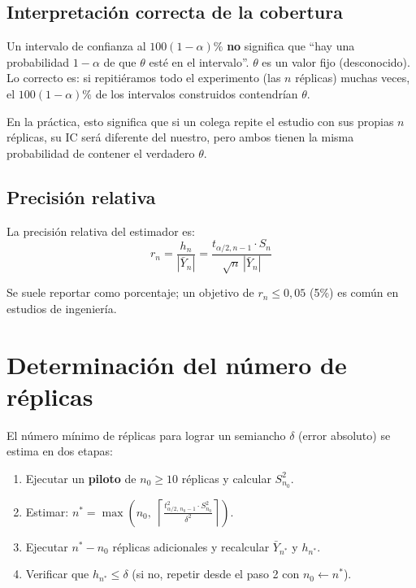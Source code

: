 \documentclass[11pt, letterpaper]{article}
\begin{document}
\subsection{Interpretación correcta de la cobertura}

\begin{definicionbox}
Un intervalo de confianza al $100(1-\alpha)\%$ \textbf{no} significa que ``hay una probabilidad $1-\alpha$ de que $\theta$ esté en el intervalo''. $\theta$ es un valor fijo (desconocido). Lo correcto es: si repitiéramos todo el experimento (las $n$ réplicas) muchas veces, el $100(1-\alpha)\%$ de los intervalos construidos contendrían $\theta$.
\end{definicionbox}

En la práctica, esto significa que si un colega repite el estudio con sus propias $n$ réplicas, su IC será diferente del nuestro, pero ambos tienen la misma probabilidad de contener el verdadero $\theta$.

\subsection{Precisión relativa}

La precisión relativa del estimador es:
\[
r_n = \frac{h_n}{|\bar Y_n|} = \frac{t_{\alpha/2,n-1}\cdot S_n}{\sqrt{n}\,|\bar Y_n|}
\]

Se suele reportar como porcentaje; un objetivo de $r_n \le 0{,}05$ (5\%) es común en estudios de ingeniería.

\section{Determinación del número de réplicas}

El número mínimo de réplicas para lograr un semiancho $\delta$ (error absoluto) se estima en dos etapas:

\begin{metodobox}
\begin{enumerate}
    \item Ejecutar un \textbf{piloto} de $n_0 \ge 10$ réplicas y calcular $S_{n_0}^2$.
    \item Estimar: $\displaystyle n^* = \max\!\left(n_0,\;\left\lceil\frac{t_{\alpha/2,\,n_0-1}^2 \cdot S_{n_0}^2}{\delta^2}\right\rceil\right)$.
    \item Ejecutar $n^* - n_0$ réplicas adicionales y recalcular $\bar Y_{n^*}$ y $h_{n^*}$.
    \item Verificar que $h_{n^*} \le \delta$ (si no, repetir desde el paso 2 con $n_0 \leftarrow n^*$).
\end{enumerate}
\end{metodobox}
\end{document}

